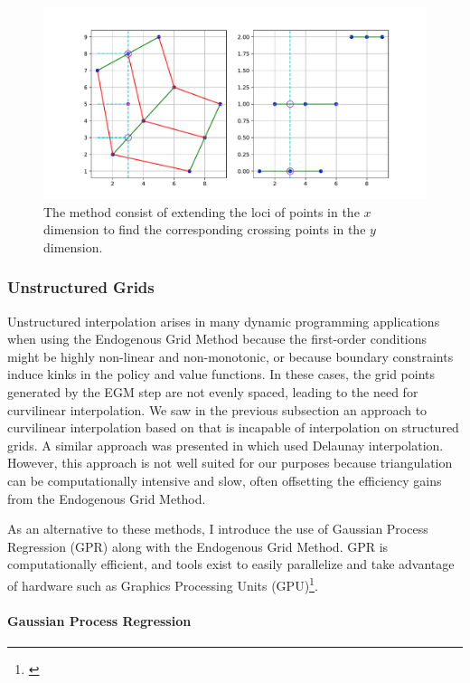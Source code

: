 \documentclass{article}
\begin{document}
\begin{figure}[!htbp]
\centering
\includegraphics[width=0.7\linewidth]{Figures/Mapping.pdf}
\caption{The method consist of extending the loci of points in the $x$ dimension to find the corresponding crossing points in the $y$ dimension.}
\label{fig:mapping}
\end{figure}

\subsubsection{Unstructured Grids}\label{Unstructured Grids}

Unstructured interpolation arises in many dynamic programming applications when using the Endogenous Grid Method because the first-order conditions might be highly non-linear and non-monotonic, or because boundary constraints induce kinks in the policy and value functions. In these cases, the grid points generated by the EGM step are not evenly spaced, leading to the need for curvilinear interpolation. We saw in the previous subsection an approach to curvilinear interpolation based on \citet{White2015} that is incapable of interpolation on structured grids. A similar approach was presented in \citet{Ludwig2018} which used Delaunay interpolation. However, this approach is not well suited for our purposes because triangulation can be computationally intensive and slow, often offsetting the efficiency gains from the Endogenous Grid Method.

As an alternative to these methods, I introduce the use of Gaussian Process Regression (GPR) along with the Endogenous Grid Method. GPR is computationally efficient, and tools exist to easily parallelize and take advantage of hardware such as Graphics Processing Units (GPU)\footnote{\citet{Gardner2018}}.

\paragraph{Gaussian Process Regression}\label{Gaussian Process Regression}
\end{document}
